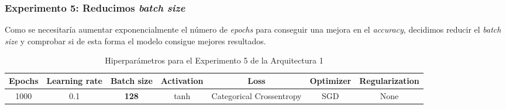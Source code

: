 \documentclass{article}
\begin{document}
		\subsubsection{Experimento 5: Reducimos \textit{batch size}}
		\label{d-s-a1-e5}
			Como se necesitar\'ia aumentar exponencialmente el n\'umero de \textit{epochs} para conseguir una mejora en el \textit{accuracy}, decidimos reducir el \textit{batch size} y comprobar si de esta forma el modelo consigue mejores resultados.
			\begin{table}[!h]
				\begin{center}
					\begin{tabular}{| c | c | c | c | c | c | c |}
						\textbf{Epochs} & \textbf{Learning rate} & \textbf{Batch size} & \textbf{Activation} & \textbf{Loss} & \textbf{Optimizer} & \textbf{Regularization} \\ \hline
						1000 & 0.1 & \textbf{128} & tanh & Categorical Crossentropy & SGD & None
					\end{tabular}
					\caption{Hiperpar\'ametros para el Experimento 5 de la Arquitectura 1}
					\label{tab:hip-d-a1-e5}
				\end{center}
			\end{table}
			
\end{document}
